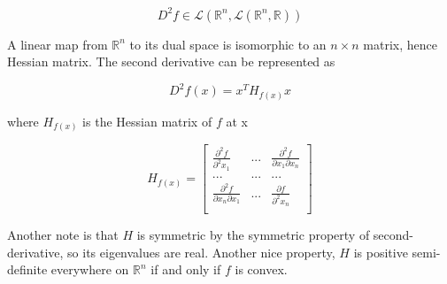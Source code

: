 \documentclass{article}
\begin{document}
\begin{equation}
    D^2 f \in \mathcal{L}(\mathbb{R}^n, \mathcal{L}(\mathbb{R}^n, \mathbb{R}))
\end{equation}

A linear map from $\mathbb{R}^n$ to its dual space is isomorphic to an $n \times n$ matrix, hence Hessian matrix. The second derivative can be represented as

\begin{equation}
    D^2 f(x) = x^T H_{f(x)} x
\end{equation}

where $H_{f(x)}$ is the Hessian matrix of $f$ at x

\begin{equation}
H_{f(x)} = \begin{bmatrix}
\frac{\partial^2 f}{\partial^2 x_1} & ... & \frac{\partial^2 f}{\partial x_1 \partial x_n} \\
... & ... & ... \\
\frac{\partial^2 f}{\partial x_n \partial x_1} & ... & \frac{\partial f}{\partial^2 x_n} \\
\end{bmatrix}    
\end{equation}

Another note is that $H$ is symmetric by the symmetric property of second-derivative, so its  eigenvalues are real. Another nice property, $H$ is positive semi-definite everywhere on $\mathbb{R}^n$ if and only if $f$ is convex.




\end{document}
